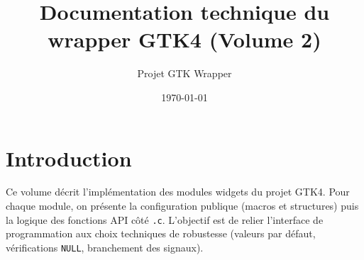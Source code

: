 \documentclass[12pt,a4paper]{article}
\title{Documentation technique du wrapper GTK4 (Volume 2)}
\author{Projet GTK Wrapper}
\date{\today}
\begin{document}
\maketitle
\tableofcontents
\newpage

\section{Introduction}
Ce volume décrit l'implémentation des modules widgets du projet GTK4. Pour chaque module, on présente la configuration publique (macros et structures) puis la logique des fonctions API côté \texttt{.c}. L'objectif est de relier l'interface de programmation aux choix techniques de robustesse (valeurs par défaut, vérifications \texttt{NULL}, branchement des signaux).

\newpage













\end{document}
